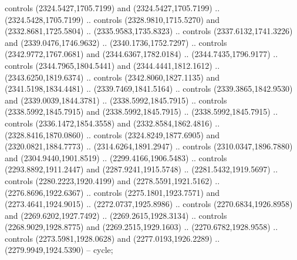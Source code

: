 \begin{scope}[shift={(19.44451,-318.97965)}]
\begin{scope}[shift={(-2093.8013,-1176.4989)}]
\begin{scope}
\begin{scope}
          controls (2324.5427,1705.7199) and (2324.5427,1705.7199) ..
          (2324.5428,1705.7199) .. controls (2328.9810,1715.5270) and
          (2332.8681,1725.5804) .. (2335.9583,1735.8323) .. controls
          (2337.6132,1741.3226) and (2339.0476,1746.9632) .. (2340.1736,1752.7297) ..
          controls (2342.9772,1767.0681) and (2344.6367,1782.0184) ..
          (2344.7435,1796.9177) .. controls (2344.7965,1804.5441) and
          (2344.4441,1812.1612) .. (2343.6250,1819.6374) .. controls
          (2342.8060,1827.1135) and (2341.5198,1834.4481) .. (2339.7469,1841.5164) ..
          controls (2339.3865,1842.9530) and (2339.0039,1844.3781) ..
          (2338.5992,1845.7915) .. controls (2338.5992,1845.7915) and
          (2338.5992,1845.7915) .. (2338.5992,1845.7915) .. controls
          (2336.1472,1854.3558) and (2332.8584,1862.4816) .. (2328.8416,1870.0860) ..
          controls (2324.8249,1877.6905) and (2320.0821,1884.7773) ..
          (2314.6264,1891.2947) .. controls (2310.0347,1896.7880) and
          (2304.9440,1901.8519) .. (2299.4166,1906.5483) .. controls
          (2293.8892,1911.2447) and (2287.9241,1915.5748) .. (2281.5432,1919.5697) ..
          controls (2280.2223,1920.4199) and (2278.5591,1921.5162) ..
          (2276.8696,1922.6367) .. controls (2275.1801,1923.7571) and
          (2273.4641,1924.9015) .. (2272.0737,1925.8986) .. controls
          (2270.6834,1926.8958) and (2269.6202,1927.7492) .. (2269.2615,1928.3134) ..
          controls (2268.9029,1928.8775) and (2269.2515,1929.1603) ..
          (2270.6782,1928.9558) .. controls (2273.5981,1928.0628) and
          (2277.0193,1926.2289) .. (2279.9949,1924.5390) -- cycle;


\end{scope}
\end{scope}
\end{scope}
\end{scope}
